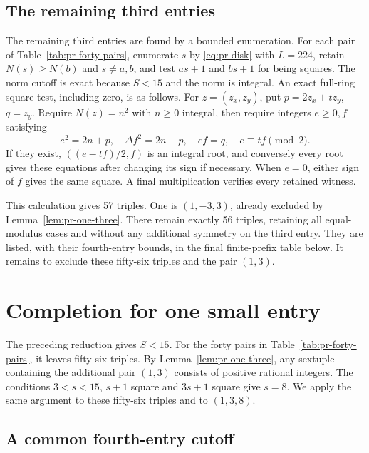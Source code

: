 \documentclass[12pt]{article}
\numberwithin{equation}{section}
\begin{document}
\subsection{The remaining third entries}

The remaining third entries are found by a bounded enumeration.
For each pair of
Table~\ref{tab:pr-forty-pairs}, enumerate \(s\) by
\eqref{eq:pr-disk} with \(L=224\), retain \(N(s)\ge N(b)\) and
\(s\ne a,b\), and test \(as+1\) and \(bs+1\) for being squares.
The norm cutoff is exact because \(S<15\) and the norm is integral.
An exact full-ring square test, including zero, is as follows.
For \(z=(z_x,z_y)\), put \(p=2z_x+tz_y\), \(q=z_y\).
Require \(N(z)=n^2\) with \(n\ge0\) integral, then require integers
\(e\ge0,f\) satisfying
\[
 e^2=2n+p,\quad \Delta f^2=2n-p,\quad ef=q,
 \quad e\equiv tf\pmod2.
\]
If they exist, \(((e-tf)/2,f)\) is an integral root, and conversely
every root gives these equations after changing its sign if necessary.
When \(e=0\), either sign of \(f\) gives the same square. A final
multiplication verifies every retained witness.

This calculation gives 57 triples. One is
\((1,-3,3)\), already excluded by Lemma~\ref{lem:pr-one-three}.
There remain exactly 56 triples, retaining all equal-modulus cases and
without any additional symmetry on the third entry. They are listed,
with their fourth-entry bounds, in the final finite-prefix table below.
It remains to exclude these fifty-six triples and the pair $(1,3)$.

\section{Completion for one small entry}\label{sec:fixed56}

The preceding reduction gives $S<15$. For the forty pairs in
Table~\ref{tab:pr-forty-pairs}, it leaves fifty-six triples.
By Lemma~\ref{lem:pr-one-three}, any sextuple containing the
additional pair $(1,3)$ consists of positive rational integers.
The conditions $3<s<15$, $s+1$ square and $3s+1$ square give $s=8$.
We apply the same argument to these fifty-six triples and to $(1,3,8)$.

\subsection{A common fourth-entry cutoff}
\end{document}
